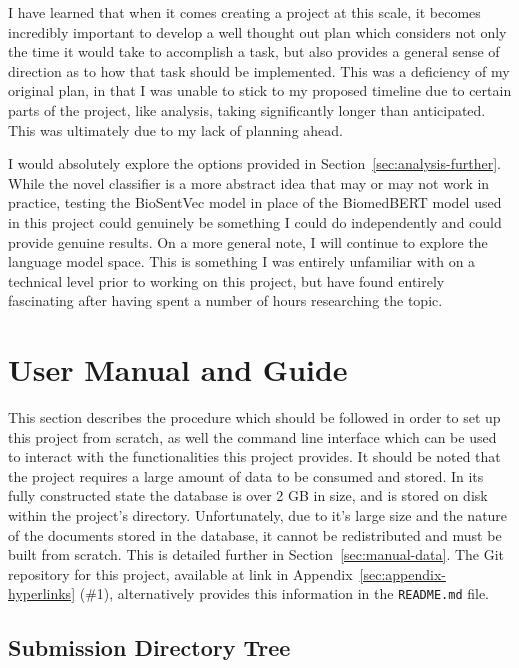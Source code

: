 \documentclass[11pt]{article}
\theoremstyle{plain}
\theoremstyle{definition}
\begin{document}
I have learned that when it comes creating a project at this scale, it becomes incredibly important to develop a well thought out plan which considers not only the time it would take to accomplish a task, but also provides a general sense of direction as to how that task should be implemented. This was a deficiency of my original plan, in that I was unable to stick to my proposed timeline due to certain parts of the project, like analysis, taking significantly longer than anticipated. This was ultimately due to my lack of planning ahead.

I would absolutely explore the options provided in Section~\ref{sec:analysis-further}. While the novel classifier is a more abstract idea that may or may not work in practice, testing the BioSentVec model in place of the BiomedBERT model used in this project could genuinely be something I could do independently and could provide genuine results. On a more general note, I will continue to explore the language model space. This is something I was entirely unfamiliar with on a technical level prior to working on this project,  but have found entirely fascinating after having spent a number of hours researching the topic.

\section{User Manual and Guide}\label{sec:manual}

This section describes the procedure which should be followed in order to set up this project from scratch, as well the command line interface which can be used to interact with the functionalities this project provides. It should be noted that the project requires a large amount of data to be consumed and stored. In its fully constructed state the database is over 2 GB in size, and is stored on disk within the project's directory. Unfortunately, due to it's large size and the nature of the documents stored in the database, it cannot be redistributed and must be built from scratch. This is detailed further in Section~\ref{sec:manual-data}. The Git repository for this project, available at link in Appendix~\ref{sec:appendix-hyperlinks} (\#1), alternatively provides this information in the \verb|README.md| file.

\subsection{Submission Directory Tree}\label{sec:manual-tree}
\end{document}
